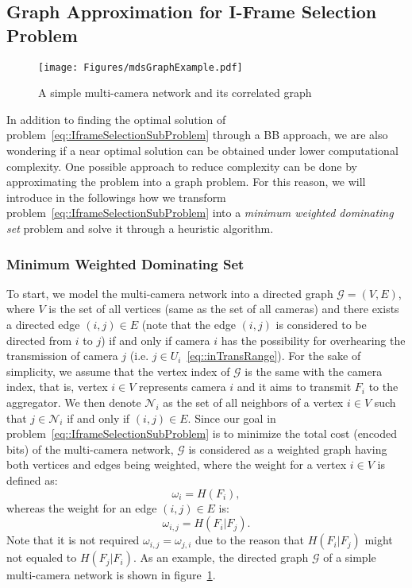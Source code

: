 \subsection{Graph Approximation for I-Frame Selection Problem}
\label{sec::graphApprox}
%
\begin{figure}
\begin{center}
\texttt{[image: Figures/mdsGraphExample.pdf]}
\caption{\label{fig::mdsGraphExample}A simple multi-camera network and its correlated graph}
\end{center}
\end{figure}
%
In addition to finding the optimal solution of problem~\eqref{eq::IframeSelectionSubProblem} through a BB approach, we are also wondering if a near optimal solution can be obtained under lower computational complexity.
One possible approach to reduce complexity can be done by approximating the problem into a graph problem.
For this reason, we will introduce in the followings how we transform problem~\eqref{eq::IframeSelectionSubProblem} into a \emph{minimum weighted dominating set} problem and solve it through a heuristic algorithm.
%
\subsubsection{Minimum Weighted Dominating Set}
To start, we model the multi-camera network into a directed graph $\mathcal{G}=(V,E)$, where $V$ is the set of all vertices (same as the set of all cameras) and there exists a directed edge $(i,j) \in E$ (note that the edge $(i,j)$ is considered to be directed from $i$ to $j$) if and only if camera $i$ has the possibility for overhearing the transmission of camera $j$ (i.e. $j \in U_i$~\eqref{eq::inTransRange}).
For the sake of simplicity, we assume that the vertex index of $\mathcal{G}$ is the same with the camera index, that is, vertex $i \in V$ represents camera $i$ and it aims to transmit $F_i$ to the aggregator.
We then denote $\mathcal{N}_i$ as the set of all neighbors of a vertex $i \in V$ such that $j \in \mathcal{N}_i$ if and only if $(i,j) \in E$.
Since our goal in problem~\eqref{eq::IframeSelectionSubProblem} is to minimize the total cost (encoded bits) of the multi-camera network, $\mathcal{G}$ is considered as a weighted graph having both vertices and edges being weighted, where the weight for a vertex $i \in V$ is defined as:
\begin{equation}
\omega_i = H(F_i),
\end{equation}
whereas the weight for an edge $(i,j) \in E$ is:
\begin{equation}
\omega_{i,j} = H(F_i|F_j).
\end{equation}
Note that it is not required $\omega_{i,j} = \omega_{j,i}$ due to the reason that $H(F_i|F_j)$ might not equaled to $H(F_j|F_i)$.
As an example, the directed graph $\mathcal{G}$ of a simple multi-camera network is shown in figure~\ref{fig::mdsGraphExample}.
%

